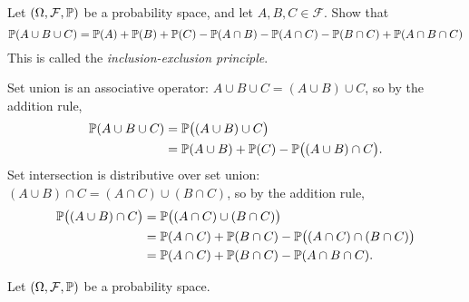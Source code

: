 
\begin{exercise}
\begin{questions}
\question %
Let $(\Omega,\mathcal{F},\mathbb{P})$ be a probability space, and let $A,B,C\in\mathcal{F}$. Show that
\[
\mathbb{P}(A\cup B\cup C) 
	= \mathbb{P}(A) + \mathbb{P}(B) + \mathbb{P}(C) - \mathbb{P}(A\cap B) - \mathbb{P}(A\cap C) - \mathbb{P}(B\cap C) + \mathbb{P}(A\cap B\cap C)
\]
This is called the \emph{inclusion-exclusion principle}.
\begin{answer}
Set union is an associative operator: $A\cup B\cup C = (A\cup B)\cup C$, so by the addition rule,
\begin{align*}
\mathbb{P}(A\cup B\cup C) 	
	& = \mathbb{P}\big((A\cup B)\cup C\big) \\
	& = \mathbb{P}(A\cup B) + \mathbb{P}(C) - \mathbb{P}\big((A\cup B)\cap C\big).
\end{align*}
Set intersection is distributive over set union: $(A\cup B)\cap C = (A\cap C)\cup (B\cap C)$, so by the addition rule,
\begin{align*}	
\mathbb{P}\big((A\cup B)\cap C\big)
	& = \mathbb{P}\big((A\cap C)\cup (B\cap C)\big) \\
	& = \mathbb{P}(A\cap C) + \mathbb{P}(B\cap C) - \mathbb{P}\big((A\cap C)\cap (B\cap C)\big) \\
	& = \mathbb{P}(A\cap C) + \mathbb{P}(B\cap C) - \mathbb{P}(A\cap B\cap C).
\end{align*}
\end{answer}

\question %
Let $(\Omega,\mathcal{F},\mathbb{P})$ be a probability space.
\end{questions}
\end{exercise}


